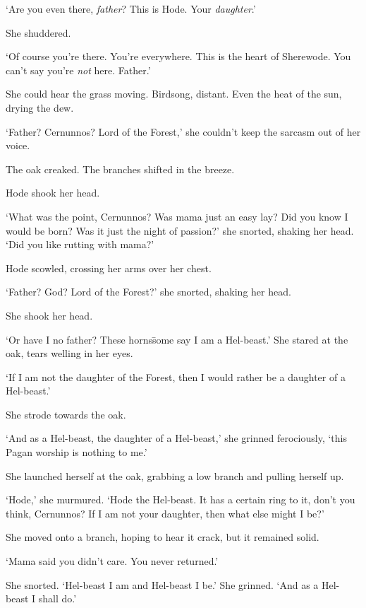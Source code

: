 `Are you even there, \textit{father}? This is Hode. Your
\textit{daughter}.'

She shuddered.

`Of course you're there. You're everywhere. This is the heart of
Sherewode. You can't say you're \textit{not} here. Father.'

She could hear the grass moving. Birdsong, distant. Even the heat of
the sun, drying the dew.

`Father? Cernunnos? Lord of the Forest,' she couldn't keep the sarcasm
out of her voice.

The oak creaked. The branches shifted in the breeze.

Hode shook her head.

`What was the point, Cernunnos? Was mama just an easy lay? Did you
know I would be born? Was it just the night of passion?' she snorted,
shaking her head. `Did you like rutting with mama?'

Hode scowled, crossing her arms over her chest.

`Father? God? Lord of the Forest?' she snorted, shaking her head.

She shook her head.

`Or have I no father? These horns\=some say I am a Hel-beast.' She
stared at the oak, tears welling in her eyes.

`If I am not the daughter of the Forest, then I would rather be a
daughter of a Hel-beast.'

She strode towards the oak.


`And as a Hel-beast, the daughter of a Hel-beast,' she grinned
ferociously, `this Pagan worship is nothing to me.'

She launched herself at the oak, grabbing a low branch and pulling
herself up.

`Hode,' she murmured. `Hode the Hel-beast. It has a certain ring to
it, don't you think, Cernunnos? If I am not your daughter, then what
else might I be?'

She moved onto a branch, hoping to hear it crack, but it remained
solid.

`Mama said you didn't care. You never returned.'

She snorted. `Hel-beast I am and Hel-beast I be.' She grinned. `And as
a Hel-beast I shall do.'

